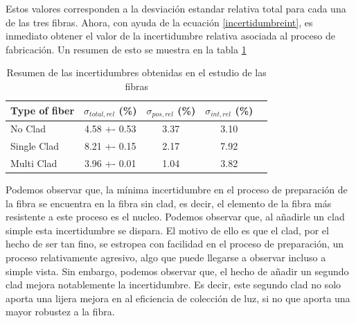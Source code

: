 Estos valores corresponden a la desviación estandar relativa total para cada una de las tres fibras. Ahora, con ayuda de la ecuación \ref{incertidumbreint}, es inmediato obtener el valor de la incertidumbre relativa asociada al proceso de fabricación. Un resumen de esto se muestra en la tabla \ref{incertidumbres}

\begin{table}[H]
\begin{center}
\begin{tabular}{l | c | c | c | c }
Type of fiber & $\sigma_{total,rel}$ (\%) & $\sigma_{pos,rel}$ (\%) &$\sigma_{int,rel}$ (\%)\\
\hline \hline
No Clad & 4.58 +- 0.53 & 3.37 & 3.10\\ 
Single Clad & 8.21 +- 0.15 & 2.17 & 7.92\\
Multi Clad & 3.96 +- 0.01 & 1.04 & 3.82
\end{tabular}
\caption{Resumen de las incertidumbres obtenidas en el estudio de las fibras\label{incertidumbres}}
\end{center}
\end{table}

Podemos observar que, la mínima incertidumbre en el proceso de preparación de la fibra se encuentra en la fibra sin clad, es decir, el elemento de la fibra más resistente a este proceso es el nucleo. Podemos observar que, al añadirle un clad simple esta incertidumbre se dispara. El motivo de ello es que el clad, por el hecho de ser tan fino, se estropea con facilidad en el proceso de preparación, un proceso relativamente agresivo, algo que puede llegarse a observar incluso a simple vista. Sin embargo, podemos observar que, el hecho de añadir un segundo clad mejora notablemente la incertidumbre. Es decir, este segundo clad no solo aporta una lijera mejora en al eficiencia de colección de luz, si no que aporta una mayor robustez a la fibra. 